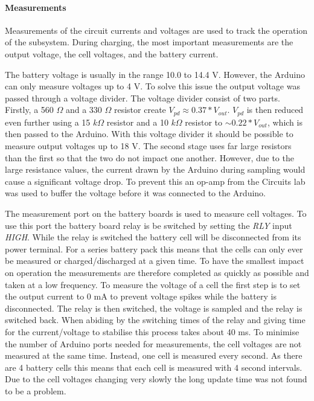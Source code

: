 \documentclass[a4paper]{article}
\begin{document}
\paragraph*{Measurements}
Measurements of the circuit currents and voltages are used to track the 
operation of the subsystem. During charging, the most important measurements 
are the output voltage, the cell voltages, and the battery current.

The battery voltage is usually in the range 10.0 to 14.4 V. However, 
the Arduino can only measure voltages up to 4 V. To solve this issue 
the output voltage was passed through a voltage divider. The voltage 
divider consist of two parts. Firstly, a 560 $\Omega$ and a 330 $\Omega$ 
resistor create $V_{pd} \approx 0.37 * V_{out}$. $V_{pd}$ is then reduced 
even further using a 15 $k\Omega$ resistor and a 10 $k\Omega$ resistor 
to $\sim 0.22 *V_{out}$, which is then passed to the Arduino. With this 
voltage divider it should be possible to measure output voltages up to 
18 V. The second stage uses far large resistors than the first so that 
the two do not impact one another. However, due to the large resistance 
values, the current drawn by the Arduino during sampling would cause a 
significant voltage drop. To prevent this an op-amp from the Circuits lab 
was used to buffer the voltage before it was connected to the Arduino.

The measurement port on the battery boards is used to measure cell voltages. 
To use this port the battery board relay is be switched by setting 
the \emph{RLY} input \emph{HIGH}. While the relay is switched the battery 
cell will be disconnected from its power terminal. For a series battery 
pack this means that the cells can only ever be measured or 
charged/discharged at a given time. To have the smallest impact on 
operation the measurements are therefore completed as quickly as possible 
and taken at a low frequency. To measure the voltage of a cell the first 
step is to set the output current to 0 mA to prevent voltage spikes 
while the battery is disconnected. The relay is then switched, the 
voltage is sampled and the relay is switched back. When abiding by the 
switching times of the relay and giving time for the current/voltage to 
stabilise this process takes about 40 ms. To minimise the number of 
Arduino ports needed for measurements, the cell voltages are not measured 
at the same time. Instead, one cell is measured every second. As there 
are 4 battery cells this means that each cell is measured with 4 second 
intervals. Due to the cell voltages changing very slowly the long update 
time was not found to be a problem.
\end{document}
